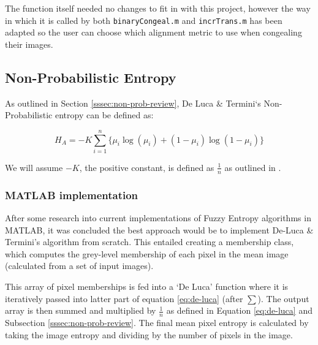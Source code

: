 The function itself needed no changes to fit in with this project, however the way in which it is called by both \texttt{binaryCongeal.m} and \texttt{incrTrans.m} has been adapted so the user can choose which alignment metric to use when congealing their images.

\subsection{Non-Probabilistic Entropy}
\label{ssec:non-prob-sec}

As outlined in Section \ref{sssec:non-prob-review}, De Luca \& Termini`s Non-Probabilistic entropy can be defined as:

\begin{equation}
  \label{eq:de-luca}
  H_A = -K \displaystyle\sum_{i=1}^{n}{\{\mu_i\log(\mu_i) + (1 - \mu_i)\log(1 - \mu_i)\}}
\end{equation}


We will assume $-K$, the positive constant, is defined as $\frac{1}{n}$ as outlined in \cite{DeLuca_Termini_1972}.

\subsubsection{MATLAB implementation}

After some research into current implementations of Fuzzy Entropy algorithms in MATLAB, it was concluded the best approach would be to implement De-Luca \& Termini's algorithm from scratch. This entailed creating a membership class, which computes the grey-level membership of each pixel in the mean image (calculated from a set of input images).

This array of pixel memberships is fed into a `De Luca' function where it is iteratively passed into latter part of equation \ref{eq:de-luca} (after $\displaystyle\sum$). The output array is then summed and multiplied by $\frac{1}{n}$ as defined in Equation \ref{eq:de-luca} and Subsection \ref{sssec:non-prob-review}. The final mean pixel entropy is calculated by taking the image entropy and dividing by the number of pixels in the image.

